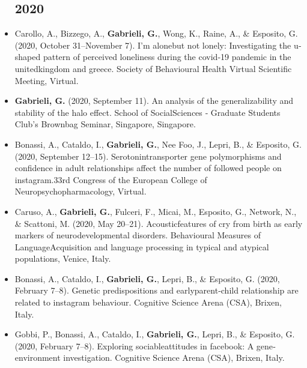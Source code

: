 \documentclass[10pt,a4paper]{altacv}
\begin{document}
\begin{fullwidth}
\begin{itemize}
\subsection*{2020}
 \item Carollo, A., Bizzego, A., \textbf{Gabrieli, G.}, Wong, K., Raine, A., \& Esposito, G. (2020, October 31–November 7). I’m alonebut not lonely: Investigating the u‐shaped pattern of perceived loneliness during the covid‐19 pandemic in the unitedkingdom and greece. Society of Behavioural Health Virtual Scientific Meeting, Virtual.
 \item  \textbf{Gabrieli, G.} (2020, September 11). An analysis of the generalizability and stability of the halo effect. School of SocialSciences ‐ Graduate Students Club’s Brownbag Seminar, Singapore, Singapore.
 \item Bonassi, A., Cataldo, I., \textbf{Gabrieli, G.}, Nee Foo, J., Lepri, B., \& Esposito, G. (2020, September 12–15). Serotonintransporter gene polymorphisms and confidence in adult relationships affect the number of followed people on instagram.33rd Congress of the European College of Neuropsychopharmacology, Virtual.
 \item Caruso, A., \textbf{Gabrieli, G.}, Fulceri, F., Micai, M., Esposito, G., Network, N., \& Scattoni, M. (2020, May 20–21). Acousticfeatures of cry from birth as early markers of neurodevelopmental disorders. Behavioural Measures of LanguageAcquisition and language processing in typical and atypical populations, Venice, Italy.
 \item Bonassi, A., Cataldo, I., \textbf{Gabrieli, G.}, Lepri, B., \& Esposito, G. (2020, February 7–8). Genetic predispositions and earlyparent‐child relationship are related to instagram behaviour. Cognitive Science Arena (CSA), Brixen, Italy.
 \item Gobbi, P., Bonassi, A., Cataldo, I., \textbf{Gabrieli, G.}, Lepri, B., \& Esposito, G. (2020, February 7–8). Exploring sociableattitudes in facebook: A gene‐environment investigation. Cognitive Science Arena (CSA), Brixen, Italy.
 

\end{itemize}
\end{fullwidth}
\end{document}
